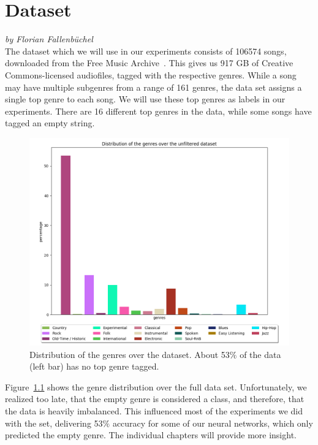 \chapter{Dataset}\label{dataset}
\textit{by Florian Fallenbüchel}\\
The dataset which we will use in our experiments consists of 106574
songs, downloaded from the Free Music Archive~\cite{fma_dataset}. This
gives us 917 GB of Creative Commons-licensed audiofiles, tagged with the
respective genres. While a song may have multiple subgenres from a range
of 161 genres, the data set assigns a single top genre to each song. We
will use these top genres as labels in our experiments. There are 16
different top genres in the data, while some songs have tagged an empty
string.

\begin{figure}[!htb]
	\centering
	\includegraphics[width=1.0\textwidth]{images/genredist.png}
	\caption{Distribution of the genres over the dataset.
	About 53$\%$ of the data (left bar) has no top genre tagged.}
	\label{unfiltered}
\end{figure}

\noindent Figure~\ref{unfiltered} shows the genre distribution over the
full data set. Unfortunately, we realized too late, that the empty genre
is considered a class, and therefore, that the data is heavily
imbalanced. This influenced most of the experiments we did with the set,
delivering 53$\%$ accuracy for some of our neural networks, which only
predicted the empty genre. The individual chapters will provide more
insight.\\

